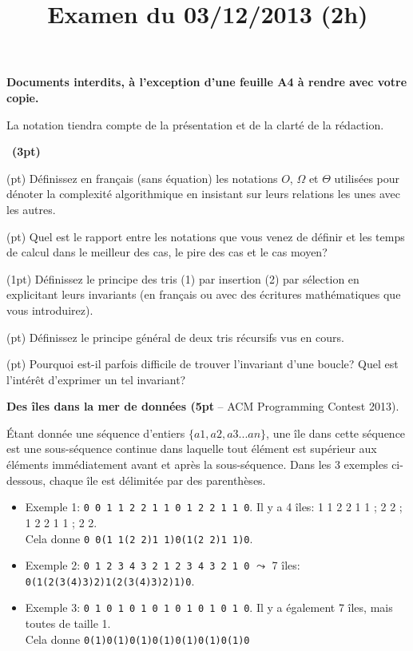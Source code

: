 \documentclass[10pt]{article}\usepackage[correction,nu]{esial}
\begin{document}
\title{Examen du 03/12/2013 (2h)}
\maketitle

\begin{centering}
  \textbf{\large Documents interdits, à l'exception d'une feuille A4 à rendre
    avec votre copie.}

\end{centering}
\centerline{La notation tiendra compte de la présentation et de la clarté de
  la rédaction.}
\bigskip

\QuestionCours~\textbf{(3pt)}

\Question(\textonehalf pt) Définissez en français (sans équation) les notations
$O$, $\Omega$ et $\Theta$ utilisées pour dénoter la complexité algorithmique en
insistant sur leurs relations les unes avec les autres.

\Question(\textonehalf pt) Quel est le rapport entre les notations que vous venez de définir et
les temps de calcul dans le meilleur des cas, le pire des cas et le cas moyen? 

\Question(1pt) Définissez le principe des tris (1) par insertion (2) par
sélection en explicitant leurs invariants (en français ou avec des écritures
mathématiques que vous introduirez).

\Question(\textonehalf pt) Définissez le principe général de deux tris récursifs
vus en cours.

\Question(\textonehalf pt) Pourquoi est-il parfois difficile de trouver
l'invariant d'une boucle? Quel est l'intérêt d'exprimer un tel invariant?

\Exercice\textbf{Des îles dans la mer de données {\rm(}5pt} -- ACM Programming Contest 2013).

Étant donnée une séquence d'entiers $\{a1, a2, a3 ... an\}$, une île dans cette
séquence est une sous-séquence continue dans laquelle tout élément est supérieur
aux éléments immédiatement avant et après la sous-séquence.  Dans les 3 exemples
ci-dessous, chaque île est délimitée par des parenthèses.

\begin{itemize}
\item Exemple 1:  \texttt{0 0 1 1 2 2 1 1 0 1 2 2 1 1 0}.
  Il y a 4 îles: 1 1 2 2 1 1 ; 2 2  ; 1 2 2 1 1 ; 2 2. \\
  Cela donne \hspace{3pt}\texttt{0 0(1 1(2 2)1 1)0(1(2 2)1 1)0}.
\item Exemple 2: \texttt{0 1 2 3 4 3 2 1 2 3 4 3 2 1 0} $\leadsto$ 7 îles:
  \texttt{0(1(2(3(4)3)2)1(2(3(4)3)2)1)0}.
\item Exemple 3: \texttt{0 1 0 1 0 1 0 1 0 1 0 1 0 1 0}. Il y a également 7
  îles, mais toutes de taille 1.\\
  Cela donne \hspace{3pt}\texttt{0(1)0(1)0(1)0(1)0(1)0(1)0(1)0}
\end{itemize}
\end{document}
